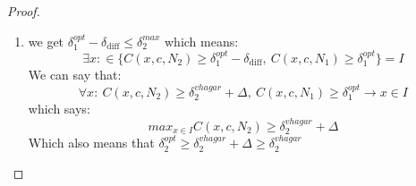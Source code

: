 \begin{proof}
\begin{enumerate}
\begin{enumerate}
    \item we get $\delta_1^{opt}-\delta_{\text{diff}} \leq \delta_2^{max}$ which means:
    $$ \exists{x}:\in \{C(x,c,N_2) \geq \delta_1^{opt}-\delta_\text{diff},\ C(x,c,N_1) \geq \delta_1^{opt}\} = I $$
    We can say that:
    $$\forall{x}:\ C(x,c,N_2)\geq \delta_2^{vhagar}+\Delta,\ C(x,c,N_1) \geq \delta_1^{opt} \rightarrow x\in{I}$$
    which says:
    $$ max_{x\in{I}}{C(x,c,N_2)} \geq \delta_2^{vhagar}+\Delta $$
    Which also means that $\delta_2^{opt} \geq \delta_2^{vhagar}+\Delta \geq \delta_2^{vhagar}$
    
    \end{enumerate} 
    
\end{enumerate} 



\begin{comment}
Let's examine the following optimization problem:
$$ max_x{\delta_\text{diff}}:\ 0 \leq |C(x,c,N_2)-C(x,c,N_1)|=\delta_\text{diff} $$
Which means that $\forall{x}:\ |C(x,c,N_2)-C(x,c,N_1)| \leq \delta_\text{diff}$.\\ \\
If $\delta_\text{diff}=0$ it means that $\forall{x}:\ |C(x,c,N_2)-C(x,c,N_1)|=0$, and specifically $\delta_1^{opt}=\delta_2^{opt}$. From previous lemma we can say $\delta_1^{opt} \geq \delta^{vhagar}_1$, so in that case, $\delta_2^{opt} \geq \delta^{vhagar}_1$. because of $\forall{x}:\ |C(x,c,N_2)-C(x,c,N_1)|=0$, we can say $\delta^{vhagar}_1=\delta^{vhagar}_2$ (otherwise it contradicts vaghar or the equality of the confidence-diff to 0). therefore: $\delta_2^{opt} \geq \delta^{vhagar}_2$ when $\delta_\text{diff}=0$.\\
We shall use the following notion: when $\delta_\text{diff}=0: \delta'=\delta_2^{opt}$ \\ \\
If $\delta_\text{diff}>0$: since $\forall{x}:\ |C(x,c,N_2)-C(x,c,N_1)| \leq \delta_\text{diff}$ it also happens:  
$$\forall{x}\in{\{x| C(x,c,N_2)\geq{\delta'},\ C(x,c,N_1)\leq{\delta_1^{opt}}\}}: |C(x,c,N_2)-C(x,c,N_1)| \leq \delta_\text{diff}$$


\end{comment}
\end{proof}

